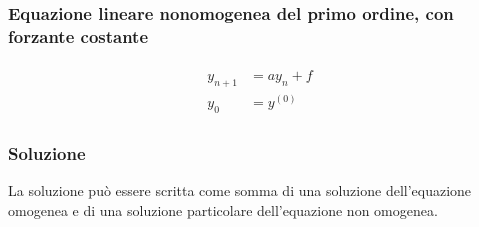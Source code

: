 \documentclass[letterpaper,10pt,italian]{jupyterBook}
\begin{document}
\subsubsection*{Equazione lineare non\sphinxhyphen{}omogenea del primo ordine, con forzante costante}
\begin{equation*}
\begin{split}\begin{aligned}
  y_{n+1} & = a y_n + f \\
  y_0     & = y^{(0)}
\end{aligned}\end{split}
\end{equation*}\subsubsection*{Soluzione}

\sphinxAtStartPar
{} La soluzione può essere scritta come somma di una soluzione dell’equazione omogenea e di una soluzione particolare dell’equazione non omogenea.
\end{document}
